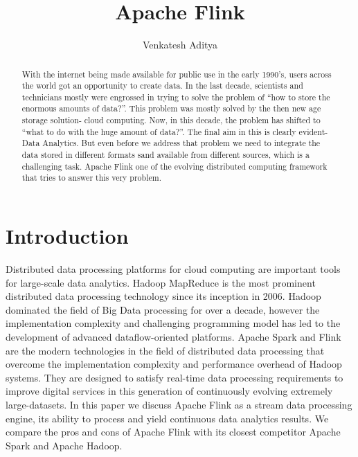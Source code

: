 
\title{Apache Flink}


\author{Venkatesh Aditya}

\renewcommand{\shortauthors}{Venkatesh Aditya}




\begin{abstract}
With the internet being made available for public use in the early 1990's, users across the world got an opportunity to create data. In the last decade, scientists and technicians mostly were engrossed in trying to solve the problem of ``how to store the enormous amounts of data?''. This problem was mostly solved by the then new age storage solution- cloud computing. Now, in this decade, the problem has shifted to ``what to do with the huge amount of data?''. The final aim in this is clearly evident- Data Analytics. But even before we address that problem we need to integrate the data stored in different formats sand available from different sources, which is a challenging task. Apache Flink one of the evolving distributed computing framework that tries to answer this very problem.
\end{abstract}


\maketitle

\section{Introduction}
Distributed data processing platforms for cloud computing are important tools for large-scale data analytics. Hadoop MapReduce is the most prominent distributed data processing technology since its inception in 2006. Hadoop dominated the field of Big Data processing for over a decade, however the implementation complexity and challenging programming model has led to the development of advanced dataflow-oriented platforms. Apache Spark and Flink are the modern technologies in the field of distributed data processing that overcome the implementation complexity and performance overhead of Hadoop systems. They are designed to satisfy real-time data processing requirements to improve digital services in this generation of continuously evolving extremely large-datasets. In this paper we discuss Apache Flink as a stream data processing engine, its ability to process and yield continuous data analytics results. We compare the pros and cons of Apache Flink with its closest competitor Apache Spark and Apache Hadoop. 

